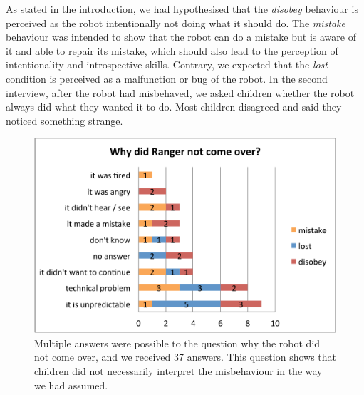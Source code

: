 \documentclass[letterpaper, 10pt, conference]{ieeeconf}
\begin{document}
As stated in the introduction, we had hypothesised that the \textit{disobey}
behaviour is perceived as the robot intentionally not doing what it should do.
The \textit{mistake} behaviour was intended to show that the robot can do a
mistake but is aware of it and able to repair its mistake, which should also
lead to the perception of intentionality and introspective skills.  Contrary, we expected that the
\textit{lost} condition is perceived as a malfunction or bug of the robot.  In
the second interview, after the robot had misbehaved, we asked children whether
the robot always did what they wanted it to do. Most children disagreed and said
they noticed something strange.

\begin{figure}[!h]
    \centering
    \includegraphics[width=0.8\linewidth]{domino-why-misbehavior.pdf}   
    \caption[Why Did the Robot Misbehave?]{\small Multiple answers were possible
    to the question why the robot did not come over, and we received 37 answers.
    This question shows that children did not necessarily interpret the misbehaviour
    in the way we had assumed.}

    \label{fig:domino-why-misbehaviour}
\end{figure}	
\end{document}
